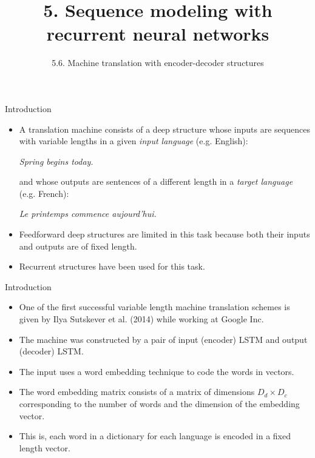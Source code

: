 \documentclass{beamer}
\title{5. Sequence modeling with recurrent neural networks}
\subtitle{5.6. Machine translation with encoder-decoder structures}
\begin{document}
\maketitle

\begin{frame}{Introduction}
\begin{itemize}
    \item A translation machine consists of a deep structure whose inputs are sequences with variable lengths in a given \emph{input language} (e.g. English):
    \begin{center}
        \emph{Spring begins today.}
    \end{center}
 and whose outputs are sentences of a different length in a \emph{target language} (e.g. French): 
 \begin{center}
     \emph{Le printemps commence aujourd'hui.}
 \end{center}
\item Feedforward deep structures are limited in this task because both their inputs and outputs are of fixed length.
\item Recurrent structures have been used for this task.
\end{itemize}
\end{frame}

\begin{frame}{Introduction}
\begin{itemize}
    \item One of the first successful variable length machine translation schemes is given by Ilya Sutskever et al. (2014) while working at Google Inc.  
    \item The machine was constructed by a pair of input (encoder) LSTM and output (decoder) LSTM.
    \item The input uses a word embedding technique to code the words in vectors. 
    \item The word embedding matrix consists of a matrix of dimensions $D_d \times D_c$ corresponding to the number of words and the dimension of the embedding vector. 
    \item This is, each word in a dictionary for each language is encoded in a fixed length vector. 
\end{itemize}
    
\end{frame}
\end{document}
